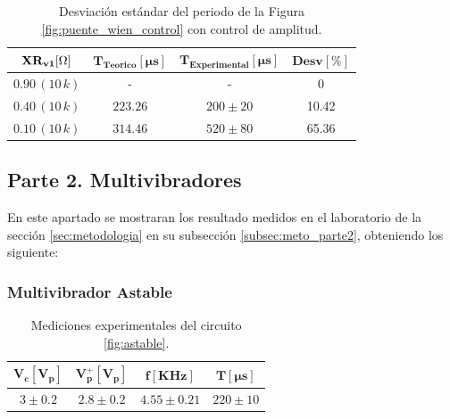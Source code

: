              \begin{table}[H]
                 \centering
                  \begin{tabular}{|c|c|c|c|}
                    \hline
                    $\mathbf{XR_{v1} [\ohm]}$ & $\mathbf{T_{Teorico} [\mu s]}$ & $\mathbf{T_{Experimental}[\mu s]}$ & $\mathbf{Desv [\%]}$ \\
                    \hline
                    $0.90 \, (10 \, k)$ & - & - & 0 \\
                    \hline
                    $0.40 \, (10 \, k)$ & $223.26$ & $200 \pm 20$ & 10.42 \\
                    \hline
                    $0.10 \, (10 \, k)$ & $314.46$ & $520 \pm 80$ & 65.36 \\
                    \hline
                  \end{tabular}
                  \caption{Desviación estándar del periodo de la Figura \ref{fig:puente_wien_control} con control de amplitud.}
                  \label{tab:desviacion_puente_wien_control}
                \end{table}


    \subsection{Parte 2. Multivibradores}\label{subsec:parte2}

        En este apartado se mostraran los resultado medidos en el laboratorio de la sección \ref{sec:metodologia} en su subsección \ref{subsec:meto_parte2}, obteniendo los siguiente:
        
        \subsubsection{Multivibrador Astable}

            \begin{table}[H]
              \centering
              \begin{tabular}{|c|c|c|c|}
                \hline
                $\mathbf{V_c [V_p]}$ & $\mathbf{V_p ^+[V_p]}$ & $\mathbf{f [KHz]}$ & $\mathbf{T [\mu s]}$ \\
                \hline
                $3 \pm 0.2$ & $2.8 \pm 0.2$ & $4.55 \pm 0.21$ & $220 \pm 10$ \\
                \hline
              \end{tabular}
              \caption{Mediciones experimentales del circuito \ref{fig:astable}.}
              \label{tab:exp_astable}
            \end{table}

